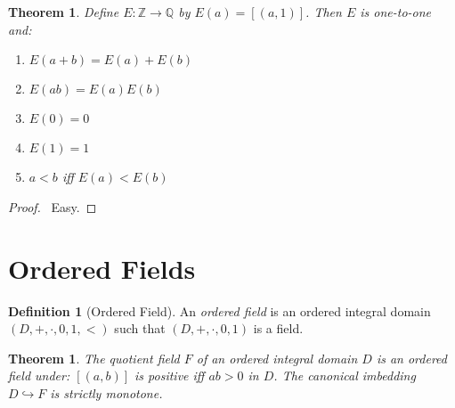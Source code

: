 \documentclass{article}
\let\qed\relax
\newtheorem{theorem}[axiom]{Theorem}
\theoremstyle{definition}
\newtheorem{definition}[axiom]{Definition}
\begin{document}
    \begin{theorem}
        Define $E : \mathbb{Z} \rightarrow \mathbb{Q}$ by $E(a) = [(a,1)]$. Then $E$ is one-to-one and:
        \begin{enumerate}
            \item $E(a+b) = E(a) + E(b)$
            \item $E(ab) = E(a)E(b)$
            \item $E(0) = 0$
            \item $E(1) = 1$
            \item $a < b$ iff $E(a) < E(b)$
        \end{enumerate}
    \end{theorem}

    \begin{proof}
        \pf\ Easy. \qed
    \end{proof}

    \section{Ordered Fields}

    \begin{definition}[Ordered Field]
        An \emph{ordered field} is an ordered integral domain $(D, +, \cdot, 0, 1, <)$ such that $(D, +, \cdot, 0, 1)$
        is a field.
    \end{definition}

    \begin{theorem}
        The quotient field $F$ of an ordered integral domain $D$ is an ordered field under: $[(a,b)]$ is positive iff $ab > 0$ in $D$.
        The canonical imbedding $D \hookrightarrow F$ is strictly monotone.
    \end{theorem}
\end{document}
